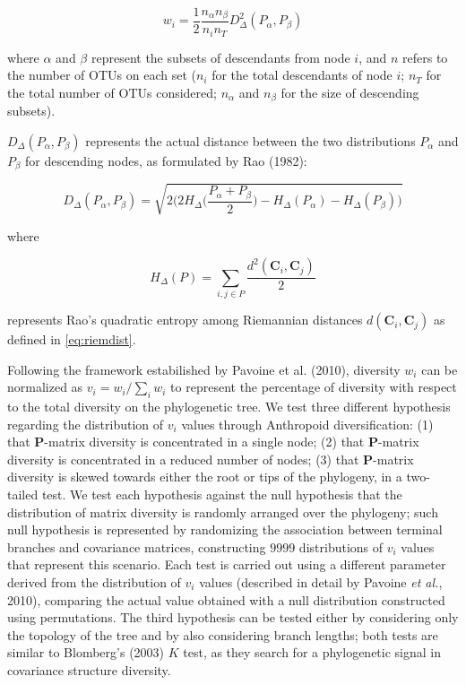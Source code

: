 \documentclass[12pt,twoside]{report}
\begin{document}
\begin{equation}
w_i = \frac{1}{2} \frac{n_\alpha n_\beta} {n_i n_T} D_{\Delta}^2(P_\alpha, P_\beta)
\label{eq:div}
\end{equation}

where $\alpha$ and $\beta$ represent the subsets of descendants from
node $i$, and $n$ refers to the number of OTUs on each set ($n_i$ for
the total descendants of node $i$; $n_T$ for the total number of OTUs
considered; $n_\alpha$ and $n_\beta$ for the size of descending
subsets).

$D_{\Delta}(P_\alpha, P_\beta)$ represents the actual distance between
the two distributions $P_\alpha$ and $P_\beta$ for descending nodes, as
formulated by Rao (1982):

\begin{equation}
D_{\Delta} (P_\alpha, P_\beta) =
\sqrt{2 \bigg( 2 H_{\Delta} \bigg( \frac{P_\alpha + P_\beta}{2} \bigg) -
H_{\Delta}(P_\alpha) - H_{\Delta}(P_\beta) \bigg)}
\label{eq:distdist}
\end{equation}

where

\begin{equation}
H_{\Delta} (P) = \sum_{i,j \in P} \frac{d^2(\mathbf{C}_i, \mathbf{C}_j)}{2}
\label{eq:rao}
\end{equation}

represents Rao's quadratic entropy among Riemannian distances
$d(\mathbf{C}_i, \mathbf{C}_j)$ as defined in \autoref{eq:riemdist}.

Following the framework estabilished by Pavoine et al. (2010), diversity
$w_i$ can be normalized as $v_i = w_i / \sum_i w_i$ to represent the
percentage of diversity with respect to the total diversity on the
phylogenetic tree. We test three different hypothesis regarding the
distribution of $v_i$ values through Anthropoid diversification: (1)
that $\mathbf{P}$-matrix diversity is concentrated in a single node; (2)
that $\mathbf{P}$-matrix diversity is concentrated in a reduced number
of nodes; (3) that $\mathbf{P}$-matrix diversity is skewed towards
either the root or tips of the phylogeny, in a two-tailed test. We test
each hypothesis against the null hypothesis that the distribution of
matrix diversity is randomly arranged over the phylogeny; such null
hypothesis is represented by randomizing the association between
terminal branches and covariance matrices, constructing $9999$
distributions of $v_i$ values that represent this scenario. Each test is
carried out using a different parameter derived from the distribution of
$v_i$ values (described in detail by Pavoine \emph{et al.}, 2010),
comparing the actual value obtained with a null distribution constructed
using permutations. The third hypothesis can be tested either by
considering only the topology of the tree and by also considering branch
lengths; both tests are similar to Blomberg's (2003) $K$ test, as they
search for a phylogenetic signal in covariance structure diversity.
\end{document}
